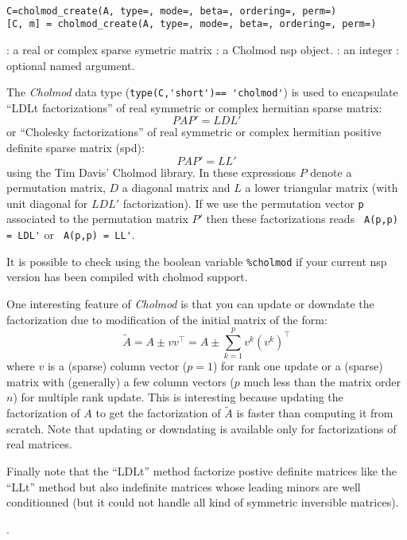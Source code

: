 
\begin{mandesc}
  \\
\end{mandesc}

\begin{calling_sequence}
\begin{verbatim}
C=cholmod_create(A, type=, mode=, beta=, ordering=, perm=)
[C, m] = cholmod_create(A, type=, mode=, beta=, ordering=, perm=)
\end{verbatim}
\end{calling_sequence}
\begin{parameters}
  \begin{varlist}
    : a real or complex sparse symetric matrix
    : a Cholmod nsp object.
    : an integer
    : optional named argument. 
  \end{varlist}
\end{parameters}

\begin{mandescription}

The \emph{Cholmod} data type (\verb+type(C,'short')== 'cholmod'+) is used to 
encapsulate  ``LDLt factorizations'' of real symmetric or complex hermitian
sparse matrix:
$$
P A P' = L D L'
$$
or ``Cholesky factorizations'' of real symmetric or complex hermitian positive definite 
sparse matrix (spd):
$$
P A P' = L L'
$$
using the Tim Davis' Cholmod library. In these expressions $P$ denote a permutation 
matrix, $D$ a diagonal matrix and $L$ a lower triangular matrix (with unit diagonal 
for $LDL'$ factorization). If we use the permutation vector \verb+p+ associated
to the permutation matrix $P'$ then these factorizations reads 
\verb+ A(p,p) = LDL'+ or  \verb+ A(p,p) = LL'+. 

It is possible to check using the boolean variable \verb+%cholmod+ 
if your current nsp version has been compiled with cholmod support.
 
One interesting feature of \emph{Cholmod} is that you can update or downdate
the factorization due to modification of the initial matrix of the form:
$$
  \tilde{A} = A \pm v v^{\top} = A \pm \sum_{k=1}^p v^k (v^k)^{\top}
$$
where $v$ is a (sparse) column vector ($p=1$) for rank one update or a (sparse) matrix
with (generally) a few column vectors ($p$ much less than the matrix order $n$) for multiple 
rank update. This is interesting because updating the factorization of $A$ to get the 
factorization of $\tilde{A}$ is faster than computing it from scratch. Note that updating
or downdating is available only for factorizations of real matrices.

Finally note that the ``LDLt'' method factorize postive definite matrices like the
``LLt'' method but also indefinite matrices whose leading minors are well conditionned
(but it could not handle all kind of symmetric inversible matrices).
\end{mandescription}. 

